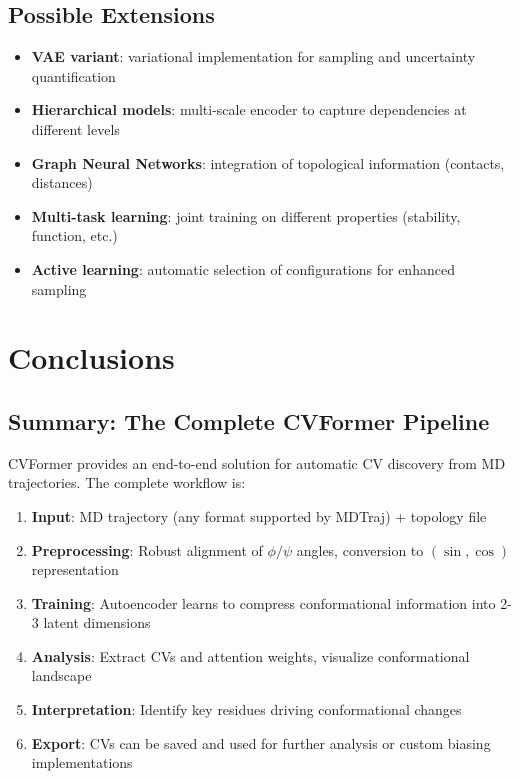 \documentclass[12pt,a4paper]{article}
\begin{document}
\subsection{Possible Extensions}
\begin{itemize}
    \item \textbf{VAE variant}: variational implementation for sampling and uncertainty quantification
    \item \textbf{Hierarchical models}: multi-scale encoder to capture dependencies at different levels
    \item \textbf{Graph Neural Networks}: integration of topological information (contacts, distances)
    \item \textbf{Multi-task learning}: joint training on different properties (stability, function, etc.)
    \item \textbf{Active learning}: automatic selection of configurations for enhanced sampling
\end{itemize}

\section{Conclusions}

\subsection{Summary: The Complete CVFormer Pipeline}

CVFormer provides an end-to-end solution for automatic CV discovery from MD trajectories. The complete workflow is:

\begin{enumerate}
    \item \textbf{Input}: MD trajectory (any format supported by MDTraj) + topology file
    \item \textbf{Preprocessing}: Robust alignment of $\phi/\psi$ angles, conversion to $(\sin, \cos)$ representation
    \item \textbf{Training}: Autoencoder learns to compress conformational information into 2-3 latent dimensions
    \item \textbf{Analysis}: Extract CVs and attention weights, visualize conformational landscape
    \item \textbf{Interpretation}: Identify key residues driving conformational changes
    \item \textbf{Export}: CVs can be saved and used for further analysis or custom biasing implementations
\end{enumerate}
\end{document}
